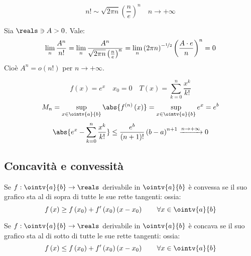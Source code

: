 \begin{theorem}
  $$n!\sim  \sqrt{2\pi n}\left(\frac{n}{e}\right)^n\quad n\to+\infty$$
\end{theorem}

\begin{example}
  Sia $\reals\ni A>0$. Vale:
  $$\lim_n\frac{A^n}{n!}=\lim_n\frac{A^n}{\sqrt{2\pi n}\left(\frac{n}{e}\right)^n}=\lim_n\left(2\pi n\right)^{-\nicefrac{1}{2}}\left(\frac{A\cdot e}{n}\right)^n=0$$
  Cioè $A^n=o\left(n!\right)$ per $n\to+\infty$.
\end{example}

\begin{example}
  $$f\left(x\right)=e^x\quad x_0=0\quad T\left(x\right)=\sum_{k=0}^n\frac{x^k}{k!}$$
  $$M_n=\sup_{x\in\ointv{a}{b}}\abs{f^{\left(n\right)}\left(x\right)}=\sup_{x\in\ointv{a}{b}} e^x=e^b$$
  $$\abs{e^x-\sum_{k=0}^n\frac{x^k}{k!}}\le\frac{e^b}{\left(n+1\right)!}\left(b-a\right)^{n+1}\xrightarrow{n\to+\infty}0$$
\end{example}

\subsection{Concavità e convessità}

\begin{definition}[Convessità]
  Se $f:\ointv{a}{b}\to\reals$ derivabile in $\ointv{a}{b}$ è convessa se il suo grafico sta al di sopra di tutte le sue rette tangenti:
  ossia:
  $$f\left(x\right)\ge f\left(x_0\right)+f'\left(x_0\right)\left(x-x_0\right)\qquad \forall x\in \ointv{a}{b}$$
\end{definition}

\begin{definition}[Concavità]
  Se $f:\ointv{a}{b}\to\reals$ derivabile in $\ointv{a}{b}$ è concava se il suo grafico sta al di sotto di tutte le sue rette tangenti:
  ossia:
  $$f\left(x\right)\le f\left(x_0\right)+f'\left(x_0\right)\left(x-x_0\right)\qquad \forall x\in \ointv{a}{b}$$
\end{definition}

